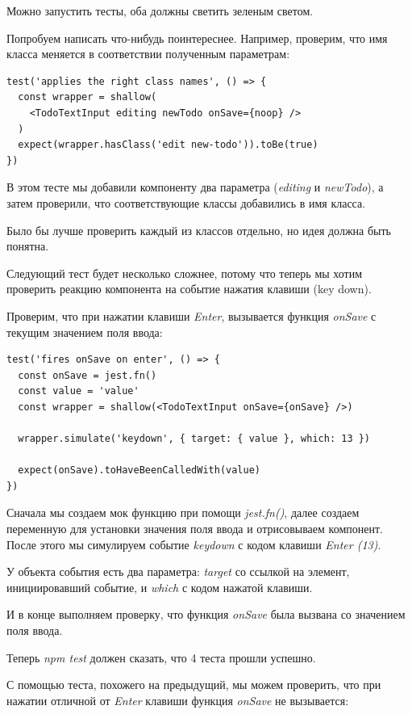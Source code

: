 Можно запустить тесты, оба должны светить зеленым светом.

Попробуем написать что-нибудь поинтереснее. Например, проверим, что имя класса меняется в соответствии полученным параметрам:

\begin{lstlisting}
test('applies the right class names', () => {
  const wrapper = shallow(
    <TodoTextInput editing newTodo onSave={noop} />
  )
  expect(wrapper.hasClass('edit new-todo')).toBe(true)
})
\end{lstlisting}

В этом тесте мы добавили компоненту два параметра (\textit{editing} и \textit{newTodo}), а затем проверили, что соответствующие классы добавились в имя класса.

Было бы лучше проверить каждый из классов отдельно, но идея должна быть понятна.

Следующий тест будет несколько сложнее, потому что теперь мы хотим проверить реакцию компонента на событие нажатия клавиши (key down).

Проверим, что при нажатии клавиши \textit{Enter}, вызывается функция \textit{onSave} с текущим значением поля ввода:

\begin{lstlisting}
test('fires onSave on enter', () => {
  const onSave = jest.fn()
  const value = 'value'
  const wrapper = shallow(<TodoTextInput onSave={onSave} />)
  
  wrapper.simulate('keydown', { target: { value }, which: 13 })
  
  expect(onSave).toHaveBeenCalledWith(value)
})
\end{lstlisting}

Сначала мы создаем мок функцию при помощи \textit{jest.fn()}, далее создаем переменную для установки значения поля ввода и отрисовываем компонент. После этого мы симулируем событие \textit{keydown} с кодом клавиши \textit{Enter (13)}.

У объекта события есть два параметра: \textit{target} со ссылкой на элемент, инициировавший событие, и \textit{which} с кодом нажатой клавиши.

И в конце выполняем проверку, что функция \textit{onSave} была вызвана со значением поля ввода.

Теперь \textit{npm test} должен сказать, что 4 теста прошли успешно.

С помощью теста, похожего на предыдущий, мы можем проверить, что при нажатии отличной от \textit{Enter} клавиши функция \textit{onSave} не вызывается:

